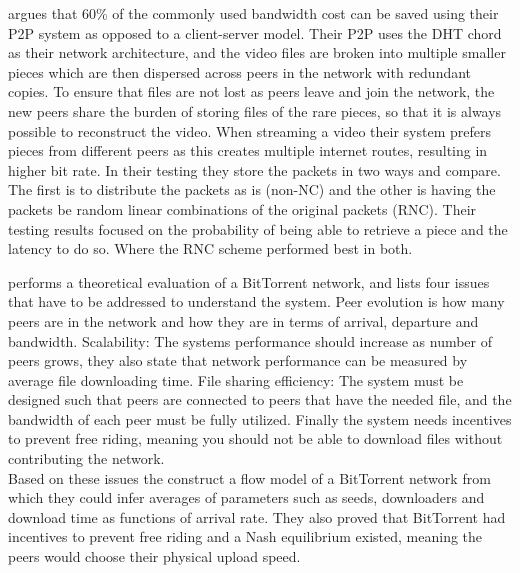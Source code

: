 \citeauthor{nguyen2009p2p} \cite{nguyen2009p2p} argues that 60\% of the commonly used bandwidth cost can be saved using their \ac{P2P} system as opposed to a client-server model. Their \acs{P2P} uses the \ac{DHT} chord as their network architecture, and the video files are broken into multiple smaller pieces which are then dispersed across peers in the network with redundant copies. To ensure that files are not lost as peers leave and join the network, the new peers share the burden of storing files of the rare pieces, so that it is always possible to reconstruct the video. When streaming a video their system prefers pieces from different peers as this creates multiple internet routes, resulting in higher bit rate. In their testing they store the packets in two ways and compare. The first is to distribute the packets as is (non-\acs{NC}) and the other is having the packets be random linear combinations of the original packets (\ac{RNC}). Their testing results focused on the probability of being able to retrieve a piece and the latency to do so. Where the \acs{RNC} scheme performed best in both.

\citeauthor{qiu2004modeling} \cite{qiu2004modeling} performs a theoretical evaluation of a BitTorrent network, and lists four issues that have to be addressed to understand the system.
Peer evolution is how many peers are in the network and how they are in terms of arrival, departure and bandwidth.
Scalability: The systems performance should increase as number of peers grows, they also state that network performance can be measured by average file downloading time.
File sharing efficiency: The system must be designed such that peers are connected to peers that have the needed file, and the bandwidth of each peer must be fully utilized.
Finally the system needs incentives to prevent free riding, meaning you should not be able to download files without contributing the network.\\
Based on these issues the construct a flow model of a BitTorrent network from which they could infer averages of parameters such as seeds, downloaders and download time as functions of arrival rate. They also proved that BitTorrent had incentives to prevent free riding and a Nash equilibrium existed, meaning the peers would choose their physical upload speed.

